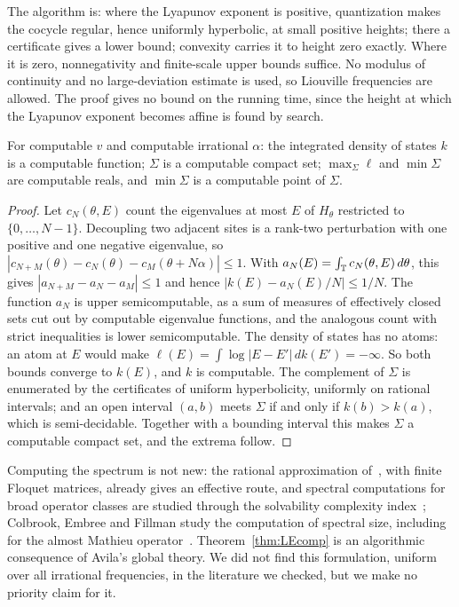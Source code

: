 The algorithm is: where the Lyapunov exponent is positive, quantization makes the cocycle regular, hence uniformly hyperbolic, at small positive heights; there a certificate gives a lower bound; convexity carries it to height zero exactly. Where it is zero, nonnegativity and finite-scale upper bounds suffice. No modulus of continuity and no large-deviation estimate is used, so Liouville frequencies are allowed. The proof gives no bound on the running time, since the height at which the Lyapunov exponent becomes affine is found by search.

\begin{corollary}\label{cor:IDScomp}
For computable $v$ and computable irrational $\alpha$: the integrated density of states $k$ is a computable function; $\Sigma$ is a computable compact set; $\max_\Sigma\ell$ and $\min\Sigma$ are computable reals, and $\min\Sigma$ is a computable point of $\Sigma$.
\end{corollary}

\begin{proof}
Let $c_N(\theta,E)$ count the eigenvalues at most $E$ of $H_\theta$ restricted to $\{0,\dots,N-1\}$. Decoupling two adjacent sites is a rank-two perturbation with one positive and one negative eigenvalue, so $|c_{N+M}(\theta)-c_N(\theta)-c_M(\theta+N\alpha)|\le1$. With $a_N(E)=\int_\mathbb T c_N(\theta,E)\,d\theta$, this gives $|a_{N+M}-a_N-a_M|\le1$ and hence $|k(E)-a_N(E)/N|\le1/N$. The function $a_N$ is upper semicomputable, as a sum of measures of effectively closed sets cut out by computable eigenvalue functions, and the analogous count with strict inequalities is lower semicomputable. The density of states has no atoms: an atom at $E$ would make $\ell(E)=\int\log|E-E'|\,dk(E')=-\infty$. So both bounds converge to $k(E)$, and $k$ is computable. The complement of $\Sigma$ is enumerated by the certificates of uniform hyperbolicity, uniformly on rational intervals; and an open interval $(a,b)$ meets $\Sigma$ if and only if $k(b)>k(a)$, which is semi-decidable. Together with a bounding interval this makes $\Sigma$ a computable compact set, and the extrema follow.
\end{proof}

\begin{remark}\label{rem:compprior}
Computing the spectrum is not new: the rational approximation of~\cite[Lemma~2.7]{DMuniv}, with finite Floquet matrices, already gives an effective route, and spectral computations for broad operator classes are studied through the solvability complexity index~\cite{BACHNS2015,ColbrookHansen2019}; Colbrook, Embree and Fillman study the computation of spectral size, including for the almost Mathieu operator~\cite{CEF2026}. Theorem~\ref{thm:LEcomp} is an algorithmic consequence of Avila's global theory. We did not find this formulation, uniform over all irrational frequencies, in the literature we checked, but we make no priority claim for it.
\end{remark}

